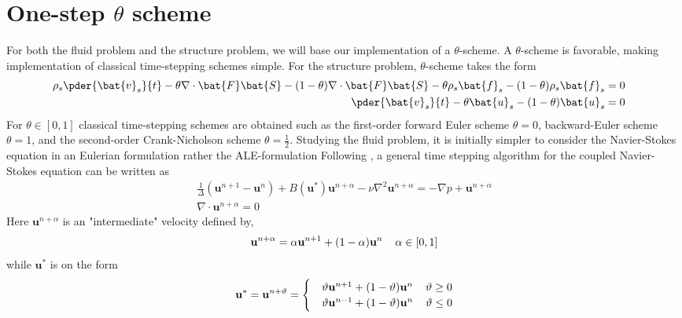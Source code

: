 \section{One-step $\theta$ scheme} 
\label{sec:theta}
For both the fluid problem and the structure problem, we will base our implementation of a $\theta$-scheme.  A $\theta$-scheme is favorable, making implementation of classical time-stepping schemes simple. For the structure problem,  $\theta$-scheme takes the form
\begin{align*}
\rho_s \pder{\bat{v}_s}{t} 
- \theta \nabla \cdot \bat{F}\bat{S}   - (1 - \theta) \nabla \cdot \bat{F}\bat{S}  
- \theta \rho_s \bat{f}_s 
- (1 - \theta) \rho_s \bat{f}_s = 0 \\
\pder{\bat{v}_s}{t} - \theta \bat{u}_s - (1 - \theta)\bat{u}_s  = 0&\\
\end{align*} 
For $\theta \in [0, 1]$ classical time-stepping schemes are obtained such as the first-order forward Euler scheme $\theta = 0$, backward-Euler scheme $\theta = 1$, and the second-order Crank-Nicholson scheme $\theta = \frac{1}{2}$. Studying the fluid problem, it is initially simpler to consider the Navier-Stokes equation in an Eulerian formulation rather the ALE-formulation Following \cite{Simo1994}, a general time stepping algorithm for the coupled Navier-Stokes equation can be written as
\begin{align*}
\frac{1}{\Delta}(\mathbf{u}^{n+1} - \mathbf{u}^{n}) + 
B(\mathbf{u}^{*})\mathbf{u}^{n+\alpha}
- \nu \nabla^2 \mathbf{u}^{n + \alpha} = - \nabla p + \mathbf{u}^{n+\alpha} \\
\nabla \cdot \mathbf{u}^{n+\alpha} = 0 
\end{align*} 
Here $\mathbf{u}^{n+\alpha}$ is an "intermediate" velocity defined by,
\begin{align*}
\mathbf{u}^{n+\alpha} = \alpha\mathbf{u}^{n+1} + (1 - \alpha)\mathbf{u}^{n} 
\hspace{4mm} \alpha \in [0, 1]
\end{align*}
while $\mathbf{u}^{*}$ is on the form
\begin{align*}
\mathbf{u}^{*} =   \mathbf{u}^{n+ \vartheta} =
\begin{cases} 
   &\vartheta \mathbf{u}^{n+1} + (1 - \vartheta)\mathbf{u}^{n} \hspace{4mm} \vartheta \geq 0 \\ 
   &\vartheta \mathbf{u}^{n-1} + (1 - \vartheta)\mathbf{u}^{n} \hspace{4mm} \vartheta \leq 0
   \end{cases}
\end{align*}
